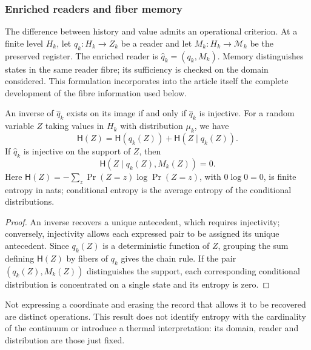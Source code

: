 \subsubsection{Enriched readers and fiber memory}
\label{hmtfg:base:sec:ch-memoria-fibra}

The difference between history and value admits an operational criterion. At a
finite level \(H_k\), let \(q_k:H_k\to Z_k\) be a reader and let
\(M_k:H_k\to\mathcal M_k\) be the preserved register. The enriched reader
is \(\widehat q_k=(q_k,M_k)\). Memory distinguishes states in the same
reader fibre; its sufficiency is checked on the domain considered.
This formulation incorporates into the article itself the complete development of the
fibre information used below.

\begin{proposition}
\label{hmtfg:base:prop:ch-recuperabilidad-fibra}
An inverse of \(\widehat q_k\) exists on its image if and only if
\(\widehat q_k\) is injective. For a random variable \(Z\) taking
values in \(H_k\) with distribution \(\mu_k\), we have
\[
 \mathsf H(Z)=\mathsf H(q_k(Z))+\mathsf H(Z\mid q_k(Z)).
\]
If \(\widehat q_k\) is injective on the support of \(Z\), then
\[
 \mathsf H(Z\mid q_k(Z),M_k(Z))=0.
\]
Here \(\mathsf H(Z)=-\sum_z\Pr(Z=z)\log\Pr(Z=z)\), with
\(0\log0=0\), is finite entropy in nats; conditional entropy is
the average entropy of the conditional distributions.
\end{proposition}

\begin{proof}
An inverse recovers a unique antecedent, which requires injectivity; conversely, injectivity allows each expressed pair to be assigned its unique antecedent. Since \(q_k(Z)\) is a deterministic function of \(Z\), grouping the sum defining \(\mathsf H(Z)\) by fibers of \(q_k\) gives the chain rule. If the pair \((q_k(Z),M_k(Z))\) distinguishes the support, each corresponding conditional distribution is concentrated on a single state and its entropy is zero.
\end{proof}

Not expressing a coordinate and erasing the record that allows it to be recovered are distinct operations. This result does not identify entropy with the cardinality of the continuum or introduce a thermal interpretation: its domain, reader and distribution are those just fixed.

